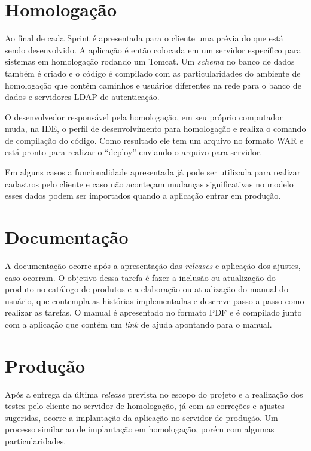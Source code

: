 \section{Homologação}
\label{sec:atividadesRealizadasHomologacao}

Ao final de cada Sprint é apresentada para o cliente uma prévia do que está sendo desenvolvido. A aplicação é então colocada em um servidor específico para sistemas em homologação rodando um Tomcat. Um \textit{schema} no banco de dados também é criado e o código é compilado com as particularidades do ambiente de homologação que contém caminhos e usuários diferentes na rede para o banco de dados e servidores LDAP de autenticação. 

O desenvolvedor responsável pela homologação, em seu próprio computador muda, na IDE, o perfil de desenvolvimento para homologação e realiza o comando de compilação do código. Como resultado ele tem um arquivo no formato WAR e está pronto para realizar o ``deploy'' enviando o arquivo para servidor.

Em alguns casos a funcionalidade apresentada já pode ser utilizada para realizar cadastros pelo cliente e caso não aconteçam mudanças significativas no modelo esses dados podem ser importados quando a aplicação entrar em produção. 



\section{Documentação}
\label{sec:atividadesRealizadasDocumentacao}

A documentação ocorre após a apresentação das \textit{releases} e aplicação dos ajustes, caso ocorram. O objetivo dessa tarefa é fazer a inclusão ou atualização do produto no catálogo de  produtos e a elaboração ou atualização do manual do usuário, que contempla as histórias implementadas e descreve passo a passo como realizar as tarefas. O manual é apresentado no formato PDF e é compilado junto com a aplicação que contém um \textit{link} de ajuda apontando para o manual.


\section{Produção}
\label{sec:atividadesRealizadasProdução}

Após a entrega da última \textit{release} prevista no escopo do projeto e a realização dos testes pelo cliente no servidor de homologação, já com as correções e ajustes sugeridas, ocorre a implantação da aplicação no servidor de produção. Um processo similar ao de implantação em homologação, porém com algumas particularidades.


